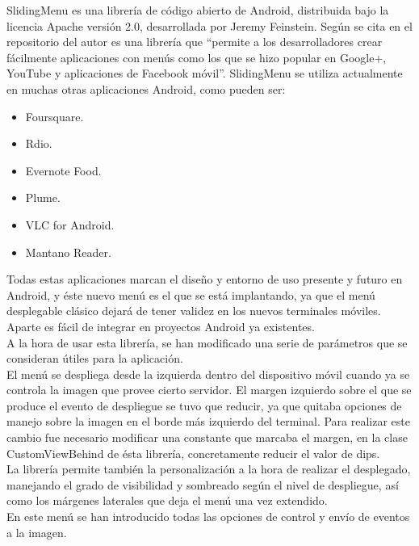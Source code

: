 SlidingMenu es una librería de código abierto de Android, distribuida bajo la licencia Apache versión 2.0, desarrollada por Jeremy Feinstein. Según se cita en el repositorio del autor es una librería que “permite a los desarrolladores crear fácilmente aplicaciones con menús como los que se hizo popular en Google+, YouTube y aplicaciones de Facebook móvil”.
SlidingMenu se utiliza actualmente en muchas otras aplicaciones Android, como pueden ser: \\

\begin{itemize}
\item Foursquare.
\item Rdio.
\item Evernote Food.
\item Plume.
\item VLC for Android.
\item Mantano Reader.\\
\end{itemize}

Todas estas aplicaciones marcan el diseño y entorno de uso presente y futuro en Android, y éste nuevo menú es el que se está implantando, ya que el menú desplegable clásico dejará de tener validez en los nuevos terminales móviles. Aparte es fácil de integrar en proyectos Android ya existentes.\\

A la hora de usar esta librería, se han modificado una serie de parámetros que se consideran útiles para la aplicación.\\

El menú se despliega desde la izquierda dentro del dispositivo móvil cuando ya se controla la imagen que provee cierto servidor. El margen izquierdo sobre el que se produce el evento de despliegue se tuvo que reducir, ya que quitaba opciones de manejo sobre la imagen en el borde más izquierdo del terminal. Para realizar este cambio fue necesario modificar una constante que marcaba el margen, en la clase CustomViewBehind de ésta librería, concretamente reducir el valor de dips. \\

La librería permite también la personalización a la hora de realizar el desplegado, manejando el grado de visibilidad y sombreado según el nivel de despliegue, así como los márgenes laterales que deja el menú una vez extendido.\\

En este menú se han introducido todas las opciones de control y envío de eventos a la imagen.\\

